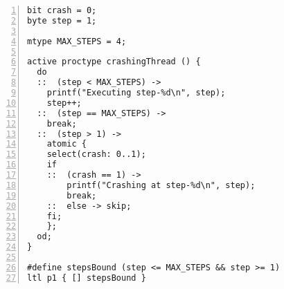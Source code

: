 \begin{Verbatim}[numbers=left]
bit crash = 0;
byte step = 1;

mtype MAX_STEPS = 4;

active proctype crashingThread () {
  do
  ::  (step < MAX_STEPS) ->
    printf("Executing step-%d\n", step);
    step++;
  ::  (step == MAX_STEPS) ->
    break;
  ::  (step > 1) ->
    atomic {
    select(crash: 0..1);
    if
    ::  (crash == 1) ->
        printf("Crashing at step-%d\n", step);
        break;
    ::  else -> skip;
    fi;
    };
  od;
}

#define stepsBound (step <= MAX_STEPS && step >= 1)
ltl p1 { [] stepsBound }    
\end{Verbatim}